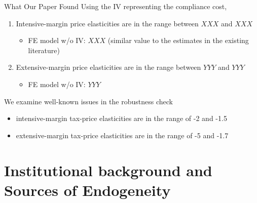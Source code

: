 \documentclass[
  ignorenonframetext,
  aspectratio=169,
]{beamer}
\providecommand{\tightlist}{%
  \setlength{\itemsep}{0pt}\setlength{\parskip}{0pt}}
\begin{document}
\begin{frame}{What Our Paper Found}
\protect\hypertarget{what-our-paper-found}{}
Using the IV representing the compliance cost,

\begin{enumerate}
\tightlist
\item
  Intensive-margin price elasticities are in the range between \(XXX\) and \(XXX\)

  \begin{itemize}
  \tightlist
  \item
    FE model w/o IV: \(XXX\) (similar value to the estimates in the existing literature)
  \end{itemize}
\item
  Extensive-margin price elasticities are in the range between \(YYY\) and \(YYY\)

  \begin{itemize}
  \tightlist
  \item
    FE model w/o IV: \(YYY\)
  \end{itemize}
\end{enumerate}

We examine well-known issues in the robustness check

\begin{itemize}
\tightlist
\item
  intensive-margin tax-price elasticities are in the range of -2 and -1.5
\item
  extensive-margin tax-price elasticities are in the range of -5 and -1.7
\end{itemize}
\end{frame}

\hypertarget{background}{%
\section{Institutional background and Sources of Endogeneity}\label{background}}
\end{document}
